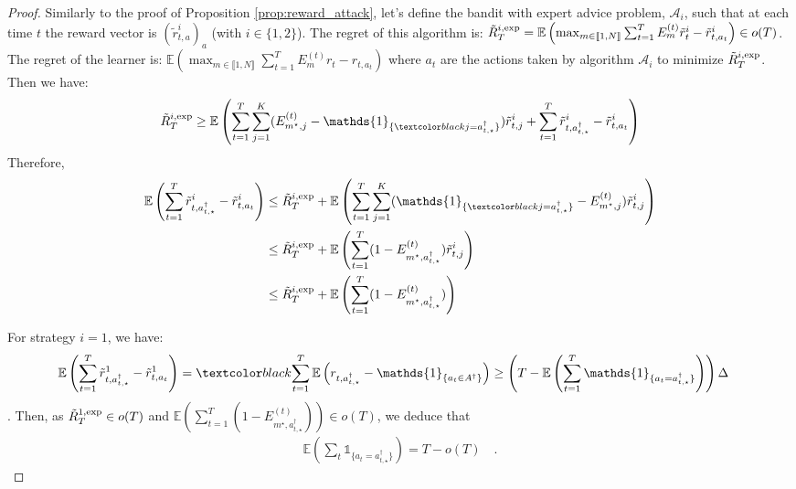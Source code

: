\begin{proof}
Similarly to the proof of Proposition \ref{prop:reward_attack}, let's define the bandit with expert advice problem, $\mathcal{A}_{i}$, such that at each time $t$ the reward vector is $(\tilde{r}^{i}_{t,a})_{a}$ (with $i\in\{1, 2\}$). The regret of this algorithm is: $\Tilde{R}_{T}^{i,\text{exp}} = \mathbb{E}\left( \max_{m\in \llbracket 1, N \rrbracket}\sum_{t=1}^{T} E_{m}^{(t)}\Tilde{r}^i_{t} - \Tilde{r}^i_{t,a_{t}}\right)\in o(T)$. The regret of the learner is: $\mathbb{E}\left( \max_{m\in \llbracket 1, N \rrbracket}\sum_{t=1}^{T} E_{m}^{(t)}r_{t} - r_{t,a_{t}}\right)$ where $a_t$ are the actions taken by algorithm $\mathcal{A}_i$ to minimize $\Tilde{R}_{T}^{i,\text{exp}}$. Then we have:
\begin{align*}
    \Tilde{R}_{T}^{i,\text{exp}} \geq \mathbb{E}\left(\sum_{t=1}^{T}\sum_{j=1}^{K} (E_{m^{\star}, j}^{(t)} - \mathds{1}_{\{\changee{j = a_{t,\star}^{\dagger}}\}})\tilde{r}_{t,j}^{i} + \sum_{t=1}^{T} \tilde{r}^{i}_{t, a^{\dagger}_{t,\star}} - \tilde{r}^{i}_{t,a_{t}} \right)
\end{align*}
Therefore, 
\begin{align*}
  \mathbb{E}\left(\sum_{t=1}^{T} \tilde{r}^{i}_{t, a^{\dagger}_{t, \star}} - \tilde{r}^{i}_{t,a_{t}} \right) &\leq \Tilde{R}_{T}^{i,\text{exp}} + \mathbb{E}\left(\sum_{t=1}^{T}\sum_{j=1}^{K} (\mathds{1}_{\{\changee{j = a_{t,\star}^{\dagger}}\}} - E_{m^{\star}, j}^{(t)})\tilde{r}_{t,j}^{i}\right) \\
  &\leq \Tilde{R}_{T}^{i,\text{exp}} + \mathbb{E}\left(\sum_{t=1}^{T}(1 - E_{m^{\star}, a^{\dagger}_{t,\star}}^{(t)})\tilde{r}_{t,j}^{i}\right) \\
  &\leq \Tilde{R}_{T}^{i,\text{exp}} + \mathbb{E}\left(\sum_{t=1}^{T}(1 - E_{m^{\star}, a^{\dagger}_{t,\star}}^{(t)})\right)
\end{align*}

For strategy $i=1$, we have:
\begin{align*}
    \mathbb{E}\left(\sum_{t=1}^{T} \tilde{r}^{1}_{t, a^{\dagger}_{t, \star}} - \tilde{r}^{1}_{t,a_{t}} \right) &=
    \changee{\sum_{t=1}^{T} \mathbb{E}\left(r_{t,a_{t,\star}^{\dagger}} - \mathds{1}_{\{ a_{t}\in A^{\dagger}\}}\right)\geq \left(T-\mathbb{E}\left(\sum_{t=1}^{T} \mathds{1}_{\{ a_{t} = a_{t,\star}^{\dagger}\}}\right)\right)\Delta}
\end{align*}
. Then, as $\Tilde{R}_{T}^{1,\text{exp}}\in o(T)$ and $\mathbb{E}\left(\sum_{t=1}^{T}(1 - E_{m^{\star}, a^{\dagger}_{t, \star}}^{(t)})\right)\in o(T)$, we deduce that
\begin{align*}
    \mathbb{E}(\sum_{t} \mathds{1}_{\{ a_{t} = a_{t,\star}
^{\dagger}\}}) = T-o(T)\quad.
\end{align*}


\end{proof}
